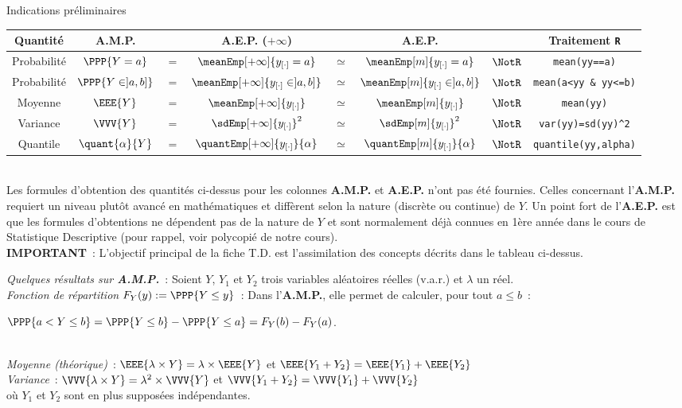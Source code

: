 \documentclass[10pt]{report}
\begin{document}
\begin{IndicList}{Indications préliminaires}
\begin{tabular}{|c|ccccccc|}\hline
\textbf{Quantité} & \textbf{A.M.P.}&&\textbf{A.E.P.} ($+\infty$) && \textbf{A.E.P.}  && \textbf{Traitement \texttt{R}} \\\hline\hline
Probabilité \phantom{\rule{1pt}{0.5cm}}& $\PPP{Y = a}$ &$=$& $\meanEmp[+\infty]{y_{[\cdot]}=a}$ &$\simeq$&$\meanEmp[m]{y_{[\cdot]}=a}$ &$\NotR$& \verb!mean(yy==a)! \\
Probabilité \phantom{\rule{1pt}{0.5cm}}& $\PPP{Y \in ]a, b]}$ &$=$& $\meanEmp[+\infty]{y_{[\cdot]}\in ]a, b]}$ &$\simeq$&$\meanEmp[m]{y_{[\cdot]}\in ]a, b]}$ &$\NotR$& \verb!mean(a<yy & yy<=b)! \\
Moyenne & $\EEE{Y}$ &$=$&$\meanEmp[+\infty]{y_{[\cdot]}}$ &$\simeq$&$\meanEmp[m]{y_{[\cdot]}}$ &$\NotR$& \verb!mean(yy)!\\
Variance & $\VVV{Y}$  &$=$& $\sdEmp[+\infty]{y_{[\cdot]}}^2$ &$\simeq$&$\sdEmp[m]{y_{[\cdot]}}^2$ &$\NotR$& \verb!var(yy)=sd(yy)^2!\\
Quantile & $\quant{\alpha}{Y}$ &$=$& $\quantEmp[+\infty]{y_{[\cdot]}}{\alpha}$  &$\simeq$&$\quantEmp[m]{y_{[\cdot]}}{\alpha}$ &$\NotR$& \verb!quantile(yy,alpha)! \\\hline
\end{tabular}
\\[0.2cm]
\noindent Les formules d'obtention des quantités ci-dessus pour les colonnes \textbf{A.M.P.} et \textbf{A.E.P.} n'ont pas été fournies. Celles concernant l'\textbf{A.M.P.} requiert un niveau plutôt avancé en mathématiques et diffèrent selon la nature (discrète ou continue) de $Y$. Un point fort de l'\textbf{A.E.P.} est que les formules d'obtentions  ne dépendent pas de la nature de $Y$ et sont normalement déjà connues en 1ère année dans le cours de Statistique Descriptive (pour rappel, voir polycopié de notre cours).\\
\noindent \textbf{IMPORTANT}~: L'objectif principal de la fiche T.D. est l'assimilation des concepts décrits dans le tableau ci-dessus. 
\item \textit{Quelques résultats sur \textbf{A.M.P.}}~: Soient $Y$, $Y_1$ et $Y_2$ trois variables aléatoires réelles (v.a.r.) et $\lambda$ un réel.\\
  \hspace*{.5cm}\textit{Fonction de répartition $F_Y(y):=\PPP{Y\leq y}$}~: Dans l'\textbf{A.M.P.}, elle permet de calculer,  pour tout $a \leq b$~:\\ 
\centerline{$\PPP{a< Y \leq b} = \PPP{Y\leq b} - \PPP{Y\leq a}=F_Y(b)-F_Y(a)$.}\\
\hspace*{.5cm}\textit{Moyenne (théorique)}~:
$\EEE{\lambda\times Y}=\lambda\times\EEE{Y}$ et $\EEE{Y_1+Y_2}=\EEE{Y_1}+\EEE{Y_2}$\\
\hspace*{.5cm}\textit{Variance}~: $\VVV{\lambda\times Y}=\lambda^2 \times \VVV{Y}$ et 
$\VVV{Y_1+Y_2}=\VVV{Y_1}+\VVV{Y_2}$ \\
\hspace*{.5cm}où $Y_1$ et $Y_2$ sont en plus supposées indépendantes.
\end{IndicList}
\end{document}
